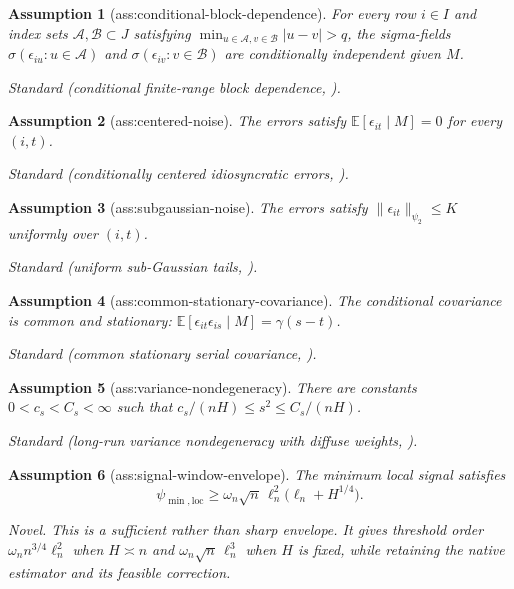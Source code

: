 \documentclass{article}
\newtheorem{assumption}{Assumption}
\begin{document}
\begin{assumption}[ass:conditional-block-dependence]\label{ass:conditional-block-dependence}
For every row \(i\in I\) and index sets \(\mathcal A,\mathcal B\subset J\) satisfying \(\min_{u\in\mathcal A,v\in\mathcal B}|u-v|>q\), the sigma-fields \(\sigma(\epsilon_{iu}:u\in\mathcal A)\) and \(\sigma(\epsilon_{iv}:v\in\mathcal B)\) are conditionally independent given \(M\).
\par\smallskip\noindent\emph{Standard} (conditional finite-range block dependence, \cite{choiYuan2025WeakFactors}).
\end{assumption}

\begin{assumption}[ass:centered-noise]\label{ass:centered-noise}
The errors satisfy \(\mathbb E[\epsilon_{it}\mid M]=0\) for every \((i,t)\).
\par\smallskip\noindent\emph{Standard} (conditionally centered idiosyncratic errors, \cite{choiYuan2024MNAR}).
\end{assumption}

\begin{assumption}[ass:subgaussian-noise]\label{ass:subgaussian-noise}
The errors satisfy \(\|\epsilon_{it}\|_{\psi_2}\le K\) uniformly over \((i,t)\).
\par\smallskip\noindent\emph{Standard} (uniform sub-Gaussian tails, \cite{choiYuan2024MNAR}).
\end{assumption}

\begin{assumption}[ass:common-stationary-covariance]\label{ass:common-stationary-covariance}
The conditional covariance is common and stationary: \(\mathbb E[\epsilon_{it}\epsilon_{is}\mid M]=\gamma(s-t)\).
\par\smallskip\noindent\emph{Standard} (common stationary serial covariance, \cite{choiYuan2025WeakFactors}).
\end{assumption}

\begin{assumption}[ass:variance-nondegeneracy]\label{ass:variance-nondegeneracy}
There are constants \(0<c_s<C_s<\infty\) such that \(c_s/(nH)\le s^2\le C_s/(nH)\).
\par\smallskip\noindent\emph{Standard} (long-run variance nondegeneracy with diffuse weights, \cite{cenLam2025TensorImputation}).
\end{assumption}

\begin{assumption}[ass:signal-window-envelope]\label{ass:signal-window-envelope}
The minimum local signal satisfies
\[
 \psi_{\min,\mathrm{loc}}
 \ge \omega_n\sqrt n\,\ell_n^2\bigl(\ell_n+H^{1/4}\bigr).
\]
\par\smallskip\noindent\emph{Novel.} This is a sufficient rather than sharp envelope. It gives threshold order \(\omega_n n^{3/4}\ell_n^2\) when \(H\asymp n\) and \(\omega_n\sqrt n\,\ell_n^3\) when \(H\) is fixed, while retaining the native estimator and its feasible correction.
\end{assumption}
\end{document}
